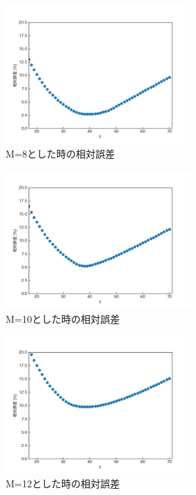 \documentclass[12pt]{jsarticle}
\begin{document}
\begin{figure}[H]
  \begin{center}
    \includegraphics[clip,width=7.0cm]{../img/M-8.png}
    \caption{M=8とした時の相対誤差}
    \label{Figure-M=8}
  \end{center}
\end{figure}
\begin{figure}[H]
  \begin{center}
    \includegraphics[clip,width=7.0cm]{../img/M-10.png}
    \caption{M=10とした時の相対誤差}
    \label{Figure-M=10}
  \end{center}
\end{figure}
\begin{figure}[H]
  \begin{center}
    \includegraphics[clip,width=7.0cm]{../img/M-12.png}
    \caption{M=12とした時の相対誤差}
    \label{Figure-M=12}
  \end{center}
\end{figure}
\end{document}
